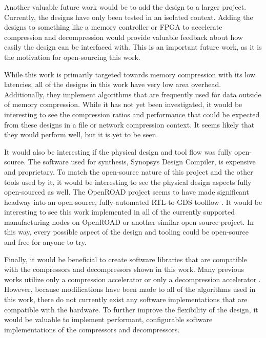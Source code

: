 \documentclass[doublespace,nopageskip]{VTthesis}
\begin{document}
Another valuable future work would be to add the design to a larger project. Currently, the designs have only been tested in an isolated context. Adding the designs to something like a memory controller or FPGA to accelerate compression and decompression would provide valuable feedback about how easily the design can be interfaced with. This is an important future work, as it is the motivation for open-sourcing this work.

While this work is primarily targeted towards memory compression with its low latencies, all of the designs in this work have very low area overhead. Additionally, they implement algorithms that are frequently used for data outside of memory compression. While it has not yet been investigated, it would be interesting to see the compression ratios and performance that could be expected from these designs in a file or network compression context.  It seems likely that they would perform well, but it is yet to be seen.

It would also be interesting if the physical design and tool flow was fully open-source. The software used for synthesis, Synopsys Design Compiler, is expensive and proprietary. To match the open-source nature of this project and the other tools used by it, it would be interesting to see the physical design aspects fully open-sourced as well. The OpenROAD project seems to have made significant headway into an open-source, fully-automated RTL-to-GDS toolflow \cite{openroad}. It would be interesting to see this work implemented in all of the currently supported manufacturing nodes on OpenROAD or another similar open-source project. In this way, every possible aspect of the design and tooling could be open-source and free for anyone to try.

Finally, it would be beneficial to create software libraries that are compatible with the compressors and decompressors shown in this work. Many previous works utilize only a compression accelerator or only a decompression accelerator \cite{hardwarelz4, fpgahuffmanlz77, gziponachip, hdfsgzip, ribeiro, deflatedecompression, lzrw1}. However, because modifications have been made to all of the algorithms used in this work, there do not currently exist any software implementations that are compatible with the hardware.  To further improve the flexibility of the design, it would be valuable to implement performant, configurable software implementations of the compressors and decompressors.
\end{document}
